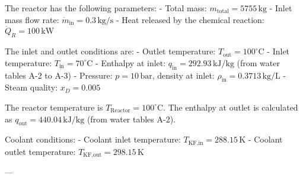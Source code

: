 The reactor has the following parameters:  
- Total mass: \( m_{\text{total}} = 5755 \, \text{kg} \)  
- Inlet mass flow rate: \( \dot{m}_{\text{in}} = 0.3 \, \text{kg/s} \)  
- Heat released by the chemical reaction: \( \dot{Q}_R = 100 \, \text{kW} \)  

The inlet and outlet conditions are:  
- Outlet temperature: \( T_{\text{out}} = 100^\circ\text{C} \)  
- Inlet temperature: \( T_{\text{in}} = 70^\circ\text{C} \)  
- Enthalpy at inlet: \( q_{\text{in}} = 292.93 \, \text{kJ/kg} \) (from water tables A-2 to A-3)  
- Pressure: \( p = 10 \, \text{bar} \), density at inlet: \( \rho_{\text{in}} = 0.3713 \, \text{kg/L} \)  
- Steam quality: \( x_D = 0.005 \)  

The reactor temperature is \( T_{\text{Reactor}} = 100^\circ\text{C} \).  
The enthalpy at outlet is calculated as \( q_{\text{out}} = 440.04 \, \text{kJ/kg} \) (from water tables A-2).  

Coolant conditions:  
- Coolant inlet temperature: \( T_{\text{KF,in}} = 288.15 \, \text{K} \)  
- Coolant outlet temperature: \( T_{\text{KF,out}} = 298.15 \, \text{K} \)  

---